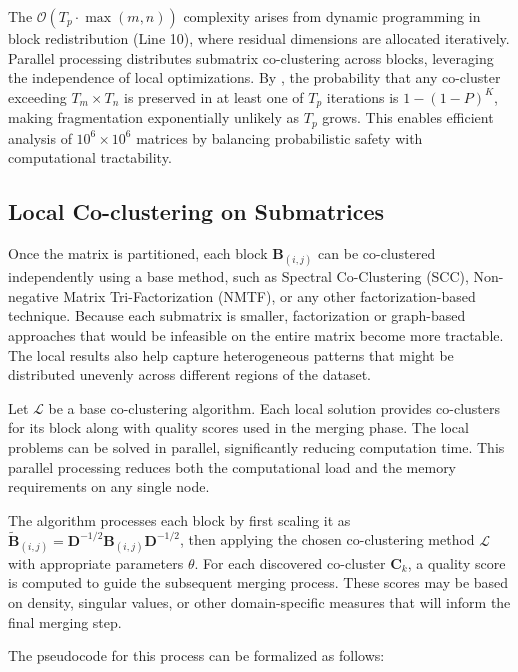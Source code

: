 \documentclass[journal]{IEEEtran}
\begin{document}
The $\mathcal{O}(T_p \cdot \max(m,n))$ complexity arises from dynamic programming in block redistribution (Line 10), where residual dimensions are allocated iteratively. Parallel processing distributes submatrix co-clustering across blocks, leveraging the independence of local optimizations. By , the probability that any co-cluster exceeding $T_m \times T_n$ is preserved in at least one of $T_p$ iterations is $1 - (1 - P)^K$, making fragmentation exponentially unlikely as $T_p$ grows. This enables efficient analysis of $10^6 \times 10^6$ matrices by balancing probabilistic safety with computational tractability.

\subsection{Local Co-clustering on Submatrices}
\label{subsec:local_co_clustering}
Once the matrix is partitioned, each block $\mathbf{B}_{(i,j)}$ can be co-clustered independently using a base method, such as Spectral Co-Clustering (SCC), Non-negative Matrix Tri-Factorization (NMTF), or any other factorization-based technique. Because each submatrix is smaller, factorization or graph-based approaches that would be infeasible on the entire matrix become more tractable. The local results also help capture heterogeneous patterns that might be distributed unevenly across different regions of the dataset.

Let $\mathcal{L}$ be a base co-clustering algorithm. Each local solution provides co-clusters for its block along with quality scores used in the merging phase. The local problems can be solved in parallel, significantly reducing computation time. This parallel processing reduces both the computational load and the memory requirements on any single node.

The algorithm processes each block by first scaling it as $\tilde{\mathbf{B}}_{(i,j)} = \mathbf{D}^{-1/2}\mathbf{B}_{(i,j)}\mathbf{D}^{-1/2}$, then applying the chosen co-clustering method $\mathcal{L}$ with appropriate parameters $\theta$. For each discovered co-cluster $\mathbf{C}_k$, a quality score is computed to guide the subsequent merging process. These scores may be based on density, singular values, or other domain-specific measures that will inform the final merging step.

The pseudocode for this process can be formalized as follows:
\end{document}
